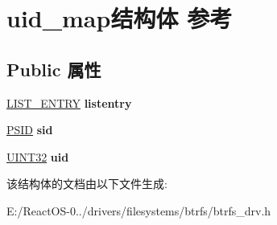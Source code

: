 \hypertarget{structuid__map}{}\section{uid\+\_\+map结构体 参考}
\label{structuid__map}
\subsection*{Public 属性}
\begin{DoxyCompactItemize}
\item 
\mbox{\label{structuid__map_a8ba34798ea27dae47d5cd65d878b6867}} 
\hyperlink{struct___l_i_s_t___e_n_t_r_y}{L\+I\+S\+T\+\_\+\+E\+N\+T\+RY} {\bfseries listentry}
\item 
\mbox{\label{structuid__map_a93102016c117c1ca8bfb405fe8b115e7}} 
\hyperlink{struct___s_i_d}{P\+S\+ID} {\bfseries sid}
\item 
\mbox{\label{structuid__map_aff83524a23ea5886e6212cc16f9482d4}} 
\hyperlink{_processor_bind_8h_ae1e6edbbc26d6fbc71a90190d0266018}{U\+I\+N\+T32} {\bfseries uid}
\end{DoxyCompactItemize}


该结构体的文档由以下文件生成\+:\begin{DoxyCompactItemize}
\item 
E\+:/\+React\+O\+S-\/0../drivers/filesystems/btrfs/btrfs\+\_\+drv.\+h\end{DoxyCompactItemize}
